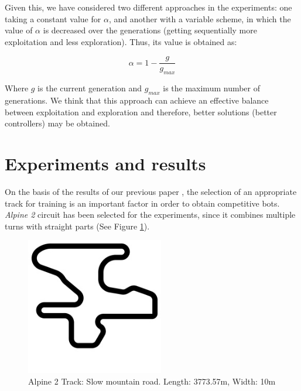 \documentclass[10pt,journal,compsoc]{IEEEtran}
\begin{document}
Given this, we have considered two different approaches in the experiments: one taking a constant value for $\alpha$, and another with a variable scheme, in which the value of $\alpha$ is decreased over the generations (getting sequentially more exploitation and less exploration). Thus, its value is obtained as:

 \begin{equation}
 	\label{eqalpha}
 	\alpha =1-\frac{g}{g_{max}}
 \end{equation}

Where $g$ is the current generation and $g_{max}$ is the maximum number of generations. We think that this approach can achieve an effective balance between exploitation and exploration and therefore, better solutions (better controllers) may be obtained.



\section{Experiments and results}  
\label{sec:results}


On the basis of the results of our previous paper \cite{salem_cig2018}, the selection of an appropriate track for training is an important factor in order to obtain competitive bots. \textit{Alpine 2} circuit has been selected for the experiments, since it combines multiple turns with straight parts (See Figure \ref{fig:alpine2_track}).

\begin{figure}[!ht]	
	\begin{center}
		\includegraphics[width=6cm]{fig/alpine2.jpg}
		\caption{Alpine 2 Track: Slow mountain road. Length: 3773.57m, Width: 10m}
		\label{fig:alpine2_track}	
	\end{center}	
\end{figure}
\end{document}
